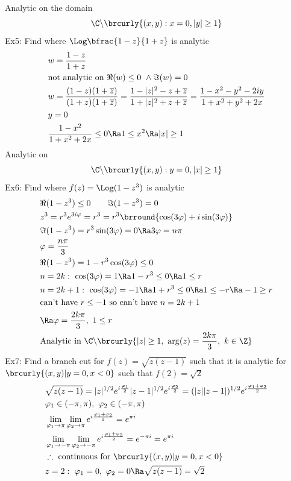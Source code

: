 Analytic on the domain
\[ \C\backslash\brcurly{(x,y):x=0,|y|\geq1} \]
Ex5: Find where $\Log\bfrac{1-z}{1+z}$ is analytic
\begin{align*}
    &w=\frac{1-z}{1+z}\\
    &\text{not analytic on }\Re(w)\leq 0\ \wedge\Im(w)=0\\
    &w=\frac{(1-z)(1+\overline{z})}{(1+z)(1+\overline{z})}=\frac{1-|z|^2-z+\overline{z}}{1+|z|^2+z+\overline{z}}=\frac{1-x^2-y^2-2iy}{1+x^2+y^2+2x}\\
    &y=0\\
    &\frac{1-x^2}{1+x^2+2x}\leq0\Ra 1\leq x^2\Ra |x|\geq 1
\end{align*}
Analytic on
\[ \C\backslash\brcurly{(x,y):y=0,|x|\geq1} \]
Ex6: Find where $f(z)=\Log(1-z^3)$ is analytic
\begin{align*}
    &\Re(1-z^3)\leq 0\quad\quad\Im(1-z^3)=0\\
    &z^3=r^3e^{3i\varphi}=r^3=r^3\brround{\cos(3\varphi)+i\sin(3\varphi)}\\
    &\Im(1-z^3)=r^3\sin(3\varphi)=0\Ra 3\varphi=n\pi\\
    &\varphi=\frac{n\pi}{3}\\
    &\Re(1-z^3)=1-r^3\cos(3\varphi)\leq0\\
    &n=2k:\ \cos(3\varphi)=1\Ra 1-r^3\leq0\Ra 1\leq r\\
    &n=2k+1:\ \cos(3\varphi)=-1\Ra 1+r^3\leq 0\Ra 1\leq -r\Ra -1\geq r\\
    &\text{can't have }r\leq -1\text{ so can't have }n=2k+1\\
    &\Ra \varphi=\frac{2k\pi}{3},\ 1\leq r\\
    &\text{Analytic in }\C\backslash\brcurly{|z|\geq 1,\ \arg(z)=\frac{2k\pi}{3},\ k\in\Z}
\end{align*}
Ex7: Find a branch cut for $f(z)=\sqrt{z(z-1)}$ such that it is analytic for $\brcurly{(x,y)|y=0,x<0}$ such that $f(2)=\sqrt{2}$
\begin{align*}
    &\sqrt{z(z-1)}=|z|^{1/2}e^{i\frac{\varphi_1}{2}}|z-1|^{1/2}e^{i\frac{\varphi_2}{2}}=(|z||z-1|)^{1/2}e^{i\frac{\varphi_1+\varphi_2}{2}}\\
    &\varphi_1\in(-\pi,\pi),\ \varphi_2\in(-\pi,\pi)\\
    &\lim_{\varphi_1\to\pi}\lim_{\varphi_2\to\pi}e^{i\frac{\varphi_1+\varphi_2}{2}}=e^{\pi i}\\
    &\lim_{\varphi_1\to-\pi}\lim_{\varphi_2\to-\pi}e^{i\frac{\varphi_1+\varphi_2}{2}}=e^{-\pi i}=e^{\pi i}\\
    &\therefore \text{ continuous for }\brcurly{(x,y)|y=0,x<0}\\
    &z=2:\ \varphi_1=0,\ \varphi_2=0\Ra \sqrt{z(z-1)}=\sqrt{2}
\end{align*}
